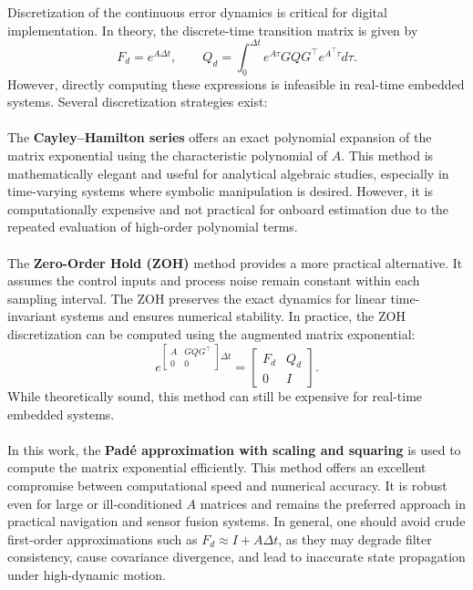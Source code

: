 \\ \\
Discretization of the continuous error dynamics is critical for digital implementation. In theory, the discrete-time transition matrix is given by
$$
    F_d = e^{A\Delta t}, \qquad
    Q_d = \int_0^{\Delta t} e^{A\tau} G Q G^\top e^{A^\top\tau} d\tau.
$$
However, directly computing these expressions is infeasible in real-time embedded systems. Several discretization strategies exist:
\\ \\
The \textbf{Cayley–Hamilton series} offers an exact polynomial expansion of the matrix exponential using the characteristic polynomial of $A$. This method is mathematically elegant and useful for analytical algebraic studies, especially in time-varying systems where symbolic manipulation is desired. However, it is computationally expensive and not practical for onboard estimation due to the repeated evaluation of high-order polynomial terms.
\\ \\
The \textbf{Zero-Order Hold (ZOH)} method provides a more practical alternative. It assumes the control inputs and process noise remain constant within each sampling interval. The ZOH preserves the exact dynamics for linear time-invariant systems and ensures numerical stability. In practice, the ZOH discretization can be computed using the augmented matrix exponential:
$$
    e^{\begin{bmatrix} A & GQG^\top \\ 0 & 0 \end{bmatrix}\Delta t}
    =
    \begin{bmatrix}
        F_d & Q_d \\
        0 & I
    \end{bmatrix}.
$$
While theoretically sound, this method can still be expensive for real-time embedded systems.  
\\ \\
In this work, the \textbf{Padé approximation with scaling and squaring} is used to compute the matrix exponential efficiently. This method offers an excellent compromise between computational speed and numerical accuracy. It is robust even for large or ill-conditioned $A$ matrices and remains the preferred approach in practical navigation and sensor fusion systems. In general, one should avoid crude first-order approximations such as $F_d \approx I + A\Delta t$, as they may degrade filter consistency, cause covariance divergence, and lead to inaccurate state propagation under high-dynamic motion.  
